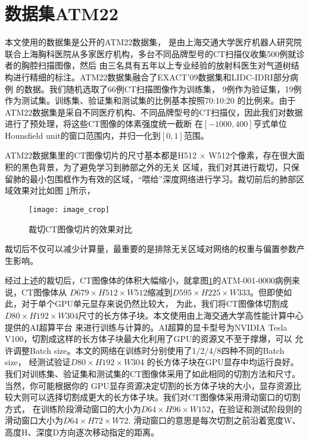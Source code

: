 \section{数据集ATM22}\label{sec:ATM22dataset}\label{sec:ATM22}
本文使用的数据集是公开的ATM22数据集\cite{Zhang2022CFDA, Zhang2021Airway, Yu2022Bronchi, Qin2019AirwayNet}，
是由上海交通大学医疗机器人研究院联合上海胸科医院从多家医疗机构，多台不同品牌型号的CT扫描仪收集500例就诊者的胸腔扫描图像，然后
由三名具有五年以上专业经验的放射科医生对气道树结构进行精细的标注。ATM22数据集融合了EXACT'09数据集和LIDC-IDRI部分病例
的数据。我们随机选取了66例CT扫描图像作为训练集， 9例作为验证集，19例作为测试集。训练集、验证集和测试集的比例基本按照70:10:20
的比例来。由于ATM22数据集是采自不同医疗机构、不同品牌型号的CT扫描仪，因此我们对数据进行了预处理，将这些CT图像的体素强度统一截断
在$[-1000, 400]$亨式单位Hounsfield unit的窗口范围内，并归一化到$[0, 1]$范围。

ATM22数据集里的CT图像切片的尺寸基本都是H512 $\times$ W512个像素，存在很大面积的黑色背景，为了避免学习到肺部之外的无关
区域，我们对其进行裁切，只保留肺的最小包围框作为有效的区域，“喂给”深度网络进行学习。裁切前后的肺部区域效果对比如图
\ref{fig:cropimage}所示，
\begin{figure}[htbp]
    \centering
    \texttt{[image: image\_crop]}
    \caption{裁切CT图像切片的效果对比}
    \label{fig:cropimage}
\end{figure}
裁切后不仅可以减少计算量，最重要的是排除无关区域对网络的权重与偏置参数产生影响。

经过上述的裁切后，CT图像体的体积大幅缩小，就拿图\ref{fig:cropimage}的ATM-001-0000病例来说，CT图像体从
$D679 \times H512 \times W512$缩减到$D595 \times H225 \times W333$。但即使如此，对于单个GPU单元显存来说仍然比较大，
为此，我们将CT图像体切割成$D80 \times H192 \times W304$尺寸的长方体子块。本文使用由上海交通大学高性能计算中心提供的AI超算平台
来进行训练与计算的。AI超算的显卡型号为NVIDIA Tesla V100，切割成这样的长方体子块最大化利用了GPU的资源又不至于撑爆，可以
允许调整Batch size。本文的网络在训练时分别使用了1/2/4/8四种不同的Batch size， 经测试验证$D80 \times H192 \times W304$
的长方体子块在GPU显存中均运行良好。我们对训练集、验证集和测试集的CT图像体采用了如此相同的切割方法和尺寸。当然，你可能根据你的
GPU显存资源决定切割的长方体子块的大小，显存资源比较大则可以选择切割成更大的长方体子块。我们对CT图像体采用滑动窗口的切割方式，
在训练阶段滑动窗口的大小为$D64 \times H96 \times W152$，在验证和测试阶段则的滑动窗口大小为$D64 \times H72 \times W72$.
滑动窗口的意思是每次切割之前沿着宽度W、高度H、深度D方向逐次移动指定的距离。


